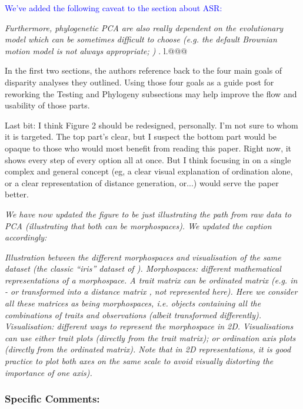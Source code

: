 \documentclass[12pt,letterpaper]{article}
\begin{document}
\textcolor{blue}{We've added the following caveat to the section about ASR:}

\textit{Furthermore, phylogenetic PCA are also really dependent on the evolutionary model which can be sometimes difficult to choose (e.g. the default Brownian motion model is not always appropriate; \citealt{blomberg2020})} . l.@@@

\noindent In the first two sections, the authors reference back to the four main goals of disparity analyses they outlined. Using those four goals as a guide post for reworking the Testing and Phylogeny subsections may help improve the flow and usability of those parts.


\noindent Last bit: I think Figure 2 should be redesigned, personally. I'm not sure to whom it is targeted. The top part's clear, but I suspect the bottom part would be opaque to those who would most benefit from reading this paper. Right now, it shows every step of every option all at once. But I think focusing in on a single complex and general concept (eg, a clear visual explanation of ordination alone, or a clear representation of distance generation, or...) would serve the paper better. 

\textit{We have now updated the figure to be just illustrating the path from raw data to PCA (illustrating that both can be morphospaces). We updated the caption accordingly:}

\textit{Illustration between the different morphospaces and visualisation of the same dataset (the classic ``iris'' dataset of \citealt{edgar1935irises,fisher1936use}).
Morphospaces: different mathematical representations of a morphospace. A trait matrix can be ordinated matrix (e.g. in \citealt{tyler2011detecting} - or transformed into a distance matrix \citealt{Close2015}, not represented here).
Here we consider all these matrices as being \textit{morphospaces}, i.e. objects containing all the combinations of traits and observations (albeit transformed differently).
Visualisation: different  ways to represent the morphospace in 2D.
Visualisations can use either trait plots (directly from the trait matrix); or ordination axis plots (directly from the ordinated matrix).
Note that in 2D representations, it is good practice to plot both axes on the same scale to avoid visually distorting the importance of one axis).}

\subsubsection{Specific Comments:}
\end{document}
